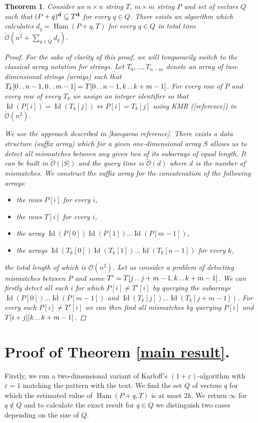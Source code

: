 \documentclass[11pt]{article}
\def\dd{\mathinner{.\,.}}
\renewcommand{\O}{\mathcal{O}}
\newcommand{\tO}{\tilde{\mathcal{O}}}
\DeclareMathOperator*{\Ham}{Ham}
\theoremstyle{plain}
\newtheorem{theorem}{Theorem}
\theoremstyle{definition}
\DeclareMathOperator*{\ID}{Id}
\begin{document}
\begin{theorem}
	Consider an $n \times n$ string $T$, $m \times m$ string $P$ and set of vectors $Q$ such that $(P + q)^\mathbf{d} \subseteq T^\mathbf{d}$ for every $q \in Q$.
	There exists an algorithm which calculates $ d_q = \Ham(P + q, T) $ for every $q \in Q$ in total time $\tO(n^2 + \sum_{q \in Q} d_q)$.
	\begin{proof}
		For the sake of clarity of this proof, we will temporarily switch to the classical array notation for strings.
		Let $T_0, \dots, T_{n - m}$ denote an array of two-dimensional strings (arrays) such that $T_k[0 \dd n - 1, 0 \dd m - 1] = T[0 \dd n - 1, k \dd k + m - 1]$.
		For every row of $P$ and every row of every $T_k$ we assign an integer identifier so that $\ID(P[i]) = \ID(T_k[j]) \Leftrightarrow P[i] = T_k[j]$ using KMR ([reference]) in $\tO(n^2)$.
		
		We use the approach described in [kangaroo reference].
		There exists a data structure (suffix array) which for a given one-dimensional array $S$ allows us to detect all mismatches between any given two of its subarrays of equal length.
		It can be built in $\tO(|S|)$ and the query time is $\tO(d)$ where $d$ is the number of mismatches.
		We construct the suffix array for the concatenation of the following arrays:
		\begin{itemize}
			\item the rows $P[i]$ for every $i$,
			\item the rows $T[i]$ for every $i$,
			\item the array $\ID(P[0]) \ID(P[1]) \dots \ID(P[m - 1])$,
			\item the arrays $\ID(T_k[0]) \ID(T_k[1]) \dots \ID(T_k[n - 1])$ for every $k$,
		\end{itemize}
		the total length of which is $\O(n^2)$.
		Let us consider a problem of detecting mismatches between $P$ and some $T' = T[j \dd j + m - 1, k \dd k + m - 1]$.
		We can firstly detect all such $i$ for which $P[i] \neq T'[i]$ by querying the subarrays $\ID(P[0]) \dots \ID(P[m - 1])$ and $\ID(T_k[j]) \dots \ID(T_k[j + m - 1])$.
		For every such $P[i] \neq T'[i]$ we can then find all mismatches by querying $P[i]$ and $T[i + j][k \dd k + m - 1]$.
	\end{proof}
\end{theorem}



\section{Proof of Theorem \ref{main result}.}
Firstly, we run a two-dimensional variant of Karloff's $(1 + \varepsilon)$-algorithm with $\varepsilon = 1$ matching the pattern with the text.
We find the set $Q$ of vectors $q$ for which the estimated value of $\Ham(P + q, T)$ is at most $2k$.
We return $\infty$ for $q \not \in Q$ and to calculate the exact result for $q \in Q$ we distinguish two cases depending on the size of $Q$.
\end{document}

